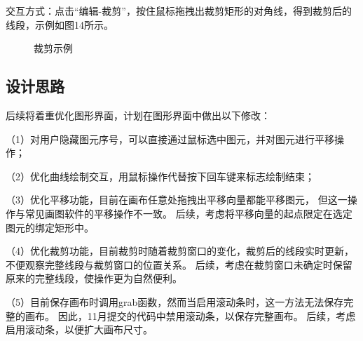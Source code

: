 \documentclass[a4paper,UTF8]{article}
\theoremstyle{definition}
\begin{document}
交互方式：点击“编辑-裁剪”，按住鼠标拖拽出裁剪矩形的对角线，得到裁剪后的线段，示例如图14所示。
\begin{figure}[H]
    \centering
        \caption{裁剪示例}
        \label{fig:1}
\end{figure}



\subsection{设计思路}
后续将着重优化图形界面，计划在图形界面中做出以下修改：

（1）对用户隐藏图元序号，可以直接通过鼠标选中图元，并对图元进行平移操作；

（2）优化曲线绘制交互，用鼠标操作代替按下回车键来标志绘制结束；

（3）优化平移功能，目前在画布任意处拖拽出平移向量都能平移图元，
但这一操作与常见画图软件的平移操作不一致。
后续，考虑将平移向量的起点限定在选定图元的绑定矩形中。

（4）优化裁剪功能，目前裁剪时随着裁剪窗口的变化，裁剪后的线段实时更新，
不便观察完整线段与裁剪窗口的位置关系。
后续，考虑在裁剪窗口未确定时保留原来的完整线段，使操作更为自然便利。

（5）目前保存画布时调用grab函数，然而当启用滚动条时，这一方法无法保存完整的画布。
因此，11月提交的代码中禁用滚动条，以保存完整画布。
后续，考虑启用滚动条，以便扩大画布尺寸。
\end{document}
